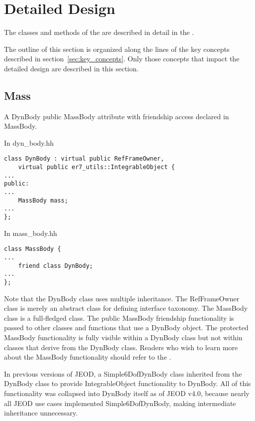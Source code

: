 \section{Detailed Design}

The classes and methods of the \ModelDesc are described in detail in the
.

The outline of this section is organized along the lines of the
key concepts described in section~\ref{sec:key_concepts}.
Only those concepts that impact the detailed design are described in
this section.


\subsection{Mass}

A DynBody \hasa public MassBody attribute with friendship access
declared in MassBody.

In dyn\_body.hh
\begin{verbatim}
class DynBody : virtual public RefFrameOwner,
    virtual public er7_utils::IntegrableObject {
...
public:
...
    MassBody mass;
...
};
\end{verbatim}

In mass\_body.hh
\begin{verbatim}
class MassBody {
...
    friend class DynBody;
...
};
\end{verbatim}

Note that the DynBody class uses multiple inheritance. The RefFrameOwner class
is merely an abstract class for defining interface taxonomy. The MassBody
class is a full-fledged class.
The public MassBody friendship
functionality is passed to other classes and functions that use a
DynBody object. The protected MassBody functionality is fully visible
within a DynBody class but not within classes that derive from the DynBody
class. Readers who wish to learn more about the MassBody
functionality should refer to the .

In previous versions of JEOD, a Simple6DofDynBody class inherited from the
DynBody class to provide IntegrableObject functionality to DynBody. All of
this functionality was collapsed into DynBody itself as of JEOD v4.0, because
nearly all JEOD use cases implemented Simple6DofDynBody, making intermediate
inheritance unnecessary.


